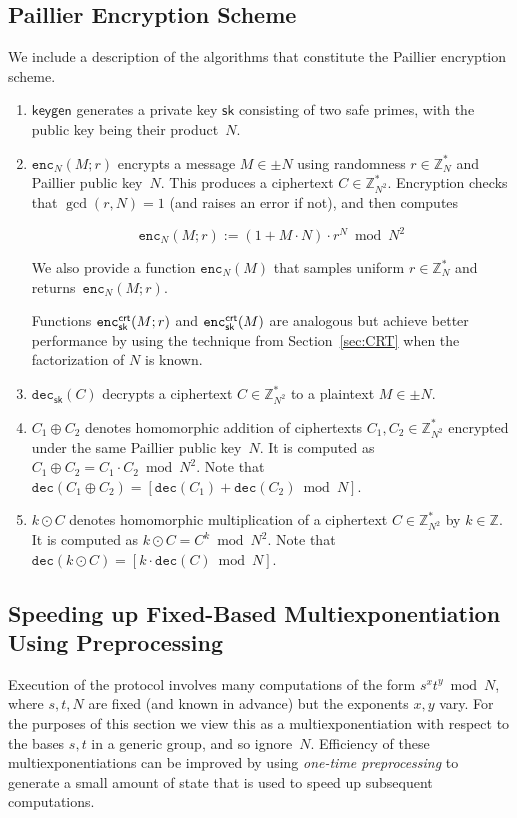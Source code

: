 \documentclass[11pt]{article}
\newcommand{\enc}{\ensuremath{\mathtt{enc}}}
\newcommand{\dec}{\ensuremath{\mathtt{dec}}}
\newcommand{\sk}{\textsf{sk}}
\newcommand{\Z}{\mathbb{Z}}
\newcommand{\?}[1]{\stackrel{?}{#1}}
\begin{document}
\subsection{Paillier Encryption Scheme}
We include a description of the algorithms that constitute the Paillier encryption scheme. 
\begin{enumerate}
    \item $\textsf{keygen}$ generates a private key $\sk$ consisting of two safe primes, with the public key being their product~$N$.
    
    
    \item 
    $\enc_N(M; r)$ 
    encrypts a message $M \in \pm N$ 
    using randomness $r \in \Z_N^*$ 
    and Paillier public key~$N$. 
    This produces a ciphertext $C \in \Z^*_{N^2}$.
    Encryption checks that $\gcd(r, N)=1$ (and raises an error if not), and then computes
    
    $$\enc_N(M; r) := (1 + M \cdot N) \cdot r^N \bmod N^2$$ 

        We also provide a function $\enc_N(M)$ that samples uniform $r \in \Z_N^*$ and returns~$\enc_N(M; r)$.

    Functions $\enc^{{\sf crt}}_{\sk}(M;r)$ and $\enc^{{\sf crt}}_{\sk}(M)$ are analogous but achieve better performance by using the technique from Section~\ref{sec:CRT} when the factorization of $N$
    is known.

    \item $\dec_{\sk}(C)$ decrypts a ciphertext $C \in \Z^*_{N^2}$ to a plaintext $M \in \pm N $.

    \item $C_1 \oplus C_2$ denotes homomorphic addition of ciphertexts $C_1, C_2 \in \Z^*_{N^2}$ encrypted under the same Paillier public key~$N$. It is computed as $C_1 \oplus C_2 = C_1 \cdot C_2 \bmod N^2$. Note that 
$\dec(C_1 \oplus C_2) = [\dec(C_1) + \dec(C_2) \bmod N]$. 

    

    \item $k \odot C$ denotes homomorphic multiplication of a ciphertext $C \in \Z^*_{N^2}$ by $k \in \Z$. It is computed as $k \odot C = C^k \bmod N^2$. Note that $\dec(k \odot C) = [k \cdot \dec(C) \bmod N]$.

    
\end{enumerate}

\subsection{Speeding up Fixed-Based Multiexponentiation Using Preprocessing}
\label{sec:multiexp}
Execution of the protocol involves many computations of the form $s^x t^y \bmod N$, where $s, t, N$ are fixed (and known in advance) but the exponents $x, y$ vary. 
For the purposes of this section we view this as a multiexponentiation with respect to the bases $s, t$ in a generic group, and so ignore~$N$.
Efficiency of these multiexponentiations can be improved by using \emph{one-time preprocessing} to generate a small amount of state that is used to speed up subsequent computations.
\end{document}
